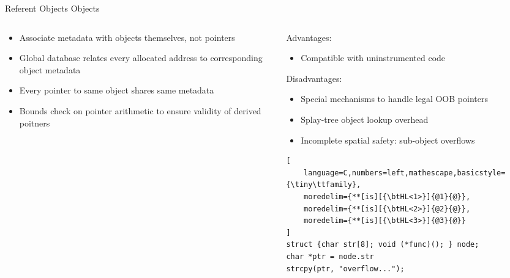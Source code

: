 \documentclass[aspectratio=169]{beamer}
\begin{document}
\begin{frame}[fragile]{Referent Objects}
Objects
\footnotesize
\begin{columns}[T]
\begin{column}{0.45\textwidth}
\begin{itemize}[<+->]
    \item Associate metadata with \alert{objects} themselves, not pointers
    \item Global database relates every allocated address to corresponding object metadata 
    \item Every pointer to same object shares same metadata
    \item Bounds check on \alert{pointer arithmetic}  to ensure validity of derived poitners 
\end{itemize}
\end{column}

\pause

\begin{column}{0.45\textwidth}
Advantages:
\begin{itemize}
  \item Compatible with uninstrumented code 
\end{itemize}
\pause
Disadvantages:
\begin{itemize}
  \item Special mechanisms to handle legal OOB pointers 
  \item Splay-tree object lookup overhead
  \item Incomplete spatial safety: \alert{sub-object overflows} 
\end{itemize}
\pause

\begin{lstlisting}[
    language=C,numbers=left,mathescape,basicstyle={\tiny\ttfamily},
    moredelim={**[is][{\btHL<1>}]{@1}{@}},
    moredelim={**[is][{\btHL<2>}]{@2}{@}},
    moredelim={**[is][{\btHL<3>}]{@3}{@}}
]
struct {char str[8]; void (*func)(); } node;
char *ptr = node.str
strcpy(ptr, "overflow...");
\end{lstlisting}
\end{column}
\end{columns}

\end{frame}
\end{document}
